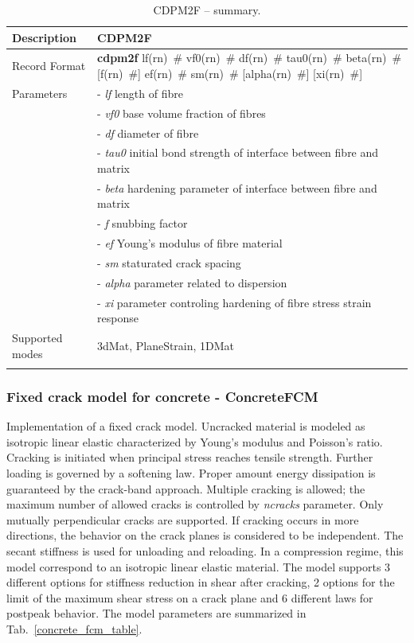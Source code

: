 \documentclass[a4paper]{article}
\newcommand{\descitem}[1]{{\noindent \bf #1}}
\newcommand{\elemparam}[2]{{{#1\tiny (#2)}~\#}}
\newcommand{\param}[1]{{\it #1}}
\newenvironment{mmt}{\begin{tabular}{|l|p{9cm}|}}{\end{tabular}\\}
\newenvironment{mmt}{\begin{tabular}{|l|l|}}{\end{tabular}\\}
\begin{document}
\begin{longtable}{|l|p{9cm}|}
\hline
Description & CDPM2F\\
\hline
Record Format & \descitem{cdpm2f} \elemparam{lf}{rn} \elemparam{vf0}{rn} \elemparam{df}{rn} \elemparam{tau0}{rn} \elemparam{beta}{rn} [\elemparam{f}{rn}] \elemparam{ef}{rn} \elemparam{sm}{rn} [\elemparam{alpha}{rn}] [\elemparam{xi}{rn}]\\
Parameters &- \param{lf} length of fibre\\
&- \param{vf0} base volume fraction of fibres\\
&- \param{df} diameter of fibre\\
&- \param{tau0} initial bond strength of interface between fibre and matrix\\
&- \param{beta} hardening parameter of interface between fibre and matrix\\
&- \param{f} snubbing factor\\
&- \param{ef} Young's modulus of fibre material\\
&- \param{sm}  staturated crack spacing\\
&- \param{alpha} parameter related to dispersion\\
&- \param{xi}  parameter controling hardening of fibre stress strain response\\
Supported modes& 3dMat, PlaneStrain, 1DMat\\
\hline
\caption{CDPM2F -- summary.}
\label{cdpm2f_table}
\end{longtable}
\subsubsection{Fixed crack model for concrete - ConcreteFCM}
\label{concreteFCM}
Implementation of a fixed crack model. Uncracked material is modeled as isotropic linear elastic characterized by Young's modulus and Poisson's ratio. 
Cracking is initiated when principal stress reaches tensile strength. Further loading is governed by a softening law. Proper amount energy dissipation is guaranteed by the crack-band approach.
Multiple cracking is allowed; the maximum number of allowed cracks is controlled by \param{ncracks} parameter. Only mutually perpendicular cracks are supported. If cracking occurs in more directions, the behavior on the crack planes is considered to be independent.
The secant stiffness is used for unloading and reloading. In a compression regime, this model correspond to an isotropic linear elastic material.
The model supports 3 different options for stiffness reduction in shear after cracking, 2 options for the limit of the maximum shear stress on a crack plane and 6 different laws for postpeak behavior. The model parameters are summarized in Tab.~\ref{concrete_fcm_table}.
\end{document}
